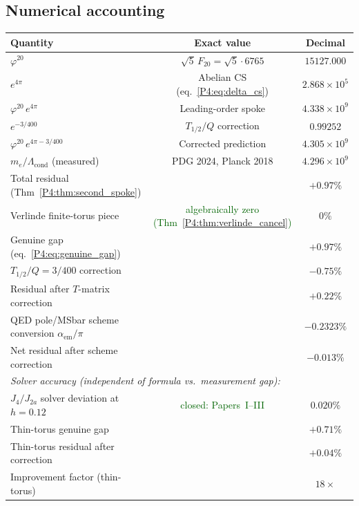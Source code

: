 \documentclass[11pt,a4paper]{article}
\theoremstyle{definition}
\theoremstyle{remark}
\newcommand{\vp}{\varphi}
\newcommand{\aem}{\alpha_{\mathrm{em}}}
\newcommand{\Lcond}{\Lambda_{\mathrm{cond}}}
\begin{document}
\newpage
\subsection{Numerical accounting}
\label{P4:sec:accounting}

\begin{center}
\renewcommand{\arraystretch}{1.45}
\begin{tabular}{lcc}
\toprule
Quantity & Exact value & Decimal \\
\midrule
$\vp^{20}$ & $\sqrt{5}\,F_{20}=\sqrt{5}\cdot6765$ & $15127.000$ \\
$e^{4\pi}$ & Abelian CS (eq.~\eqref{P4:eq:delta_cs}) & $2.868\times10^5$ \\
$\vp^{20}\,e^{4\pi}$ & Leading-order spoke & $4.338\times10^9$ \\
$e^{-3/400}$ & $T_{1/2}/Q$ correction & $0.99252$ \\
$\vp^{20}\,e^{4\pi-3/400}$ & Corrected prediction & $4.305\times10^9$ \\
$m_e/\Lcond$ (measured) & PDG 2024, Planck 2018 & $4.296\times10^9$ \\
\midrule
Total residual (Thm~\ref{P4:thm:second_spoke}) & & $+0.97\%$ \\
\quad Verlinde finite-torus piece & \textcolor{darkgreen}{algebraically zero (Thm~\ref{P4:thm:verlinde_cancel})} & $0\%$ \\
\quad Genuine gap (eq.~\eqref{P4:eq:genuine_gap}) & & $+0.97\%$ \\
$T_{1/2}/Q = 3/400$ correction & & $-0.75\%$ \\
Residual after $T$-matrix correction & & $+0.22\%$ \\
\quad QED pole/MSbar scheme conversion $\aem/\pi$ & & $-0.2323\%$ \\
\quad Net residual after scheme correction & & $-0.013\%$ \\
\midrule
\multicolumn{2}{l}{\textit{Solver accuracy (independent of formula vs.\ measurement gap):}} & \\
$J_4/J_{2a}$ solver deviation at $h=0.12$ & \textcolor{darkgreen}{closed: Papers~I--III} & $0.020\%$ \\
\midrule
Thin-torus genuine gap & & $+0.71\%$ \\
Thin-torus residual after correction & & $+0.04\%$ \\
Improvement factor (thin-torus) & & $18\times$ \\
\bottomrule
\end{tabular}
\end{center}
\end{document}
